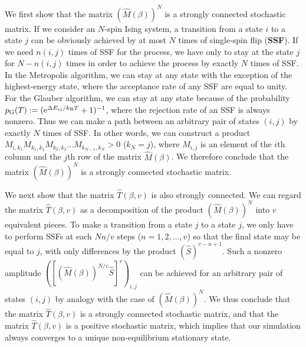 
We first show that the matrix $\left(\hat{M}(\beta)\right)^{N}$ is a strongly connected stochastic matrix. If we consider an $N$-spin Ising system, a transition from a state $i$ to a state $j$ can be obviously achieved by at most $N$ times of single-spin flip (\textbf{SSF}). If we need $n(i,j)$ times of SSF for the process, we have only to stay at the state $j$ for $N-n(i,j)$ times in order to achieve the process by exactly $N$ times of SSF. In the Metropolis algorithm, we can stay at any state with the exception of the highest-energy state, where the acceptance rate of any SSF are equal to unity. For the Glauber algorithm, we can stay at any state because of the probability $p_{\rm G}(T):=(\mathrm{e}^{\Delta E_{ij}/k_{\rm B}T}+1)^{-1}$, where the rejection rate of an SSF is always nonzero. Thus we can make a path between an arbitrary pair of states $(i,j)$ by exactly $N$ times of SSF. In other words, we can construct a product $M_{i,k_{1}}M_{k_{1},k_{2}}M_{k_{2},k_{3}}\dots M_{k_{N-1},k_{N}} > 0$ ($k_{N}=j$), where $M_{i,j}$ is an element of the $i$th column and the $j$th row of the matrix $\hat{M}(\beta)$. We therefore conclude that the matrix $\left(\hat{M}(\beta)\right)^{N}$ is a strongly connected stochastic matrix.

We next show that the matrix $\hat{T}(\beta,v)$ is also strongly connected.  We can regard the matrix $\hat{T}(\beta,v)$ as a decomposition of the product $\left(\hat{M}(\beta)\right)^{N}$ into $v$ equivalent pieces. To make a transition from a state $j$ to a state $j$, we only have to perform SSFs at each $Nn/v$ steps ($n=1,2,\dots,v$) so that the final state may be equal to $j$, with only differences by the product $\left(\hat{S}\right)^{v-n+1}$. Such a nonzero amplitude $\left(\left[\left(\hat{M}(\beta)\right)^{N/v}\hat{S}\right]^{v}\right)_{i,j}$ can be achieved for an arbitrary pair of states $(i,j)$ by analogy with the case of $\left(\hat{M}(\beta)\right)^{N}$. We thus conclude that the matrix $\hat{T}(\beta,v)$ is a strongly connected stochastic matrix, and that the matrix $\hat{T}(\beta,v)$ is a positive stochastic matrix, which implies that our simulation always converges to a unique non-equilibrium stationary state.
